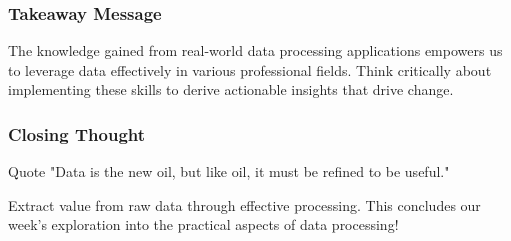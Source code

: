 \documentclass{beamer}
\begin{document}
\begin{frame}[fragile]
    \frametitle{Takeaway Message}
    The knowledge gained from real-world data processing applications empowers us to leverage data effectively in various professional fields. Think critically about implementing these skills to derive actionable insights that drive change.
\end{frame}

\begin{frame}[fragile]
    \frametitle{Closing Thought}
    \begin{block}{Quote}
        "Data is the new oil, but like oil, it must be refined to be useful." 
    \end{block}
    Extract value from raw data through effective processing. This concludes our week’s exploration into the practical aspects of data processing!
\end{frame}
\end{document}
